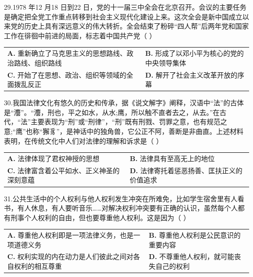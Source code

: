 \documentclass[UTF8,11pt]{ctexart}
\begin{document}
29.1978 年12 月18 日到22 日，党的十一届三中全会在北京召开。会议的主要任务是确定把全党工作重点转移到社会主义现代化建设上来。这次全会是新中国成立以来党的历史上具有深远意义的伟大转折。全会结束了粉碎“四人帮”后两年党和国家工作在徘徊中前进的局面，标志着中国共产党（     ）


\begin{center}\begin{tabular}{>{\raggedright\arraybackslash}p{\dimexpr(\linewidth-4\tabcolsep)/2\relax}>{\raggedright\arraybackslash}p{\dimexpr(\linewidth-4\tabcolsep)/2\relax}}
\textbf{A.} 重新确立了马克思主义的思想路线、政治路线、组织路线 & \textbf{B.} 形成了以邓小平为核心的党的中央领导集体\\[.35em]
\textbf{C.} 开始了在思想、政治、组织等领域的全面拨乱反正 & \textbf{D.} 解开了社会主义改革开放的序幕\\[.35em]\end{tabular}\end{center}

30.我国法律文化有悠久的历史和传承，据《说文解字》阐释，汉语中“法”的古体是“灋”。“灋，刑也，平之如水，从水;鹰，所以触不直者去之，从去。”在古代，“法”主要表现为“刑”或“刑律”，“刑”既有刑戮、罚罪之意，也有规范之意;“鹰”也称“獬豸”，是神话中的独角兽，它公正不阿，善断是非曲直。上述材料表明，在传统文化中人们对法律的理解和诉求是（     ）


\begin{center}\begin{tabular}{>{\raggedright\arraybackslash}p{\dimexpr(\linewidth-4\tabcolsep)/2\relax}>{\raggedright\arraybackslash}p{\dimexpr(\linewidth-4\tabcolsep)/2\relax}}
\textbf{A.} 法律体现了君权神授的思想 & \textbf{B.} 法律具有至高无上的地位\\[.35em]
\textbf{C.} 法律富含着公平如水、正义神圣的深刻意蕴 & \textbf{D.} 法律寄托着惩恶扬善、匡扶正义的价值追求\\[.35em]\end{tabular}\end{center}

31.公共生活中的个人权利与他人权利发生冲突在所难免，比如学生宿舍里有人看书，有人休息，有人要听音乐……对解决权利冲突要有正确的认识，虽然每个人都有刑事个人权利的自由，但也要尊重他人权利。这是因为（     ）


\begin{center}\begin{tabular}{>{\raggedright\arraybackslash}p{\dimexpr(\linewidth-4\tabcolsep)/2\relax}>{\raggedright\arraybackslash}p{\dimexpr(\linewidth-4\tabcolsep)/2\relax}}
\textbf{A.} 尊重他人权利即是一项法律义务，也是一项道德义务 & \textbf{B.} 尊重他人权利是公民意识的重要内容\\[.35em]
\textbf{C.} 权利实现的内在动力是人们彼此之间对各自权利的相互尊重 & \textbf{D.} 不尊重他人权利，就可能丧失自己的权利\\[.35em]\end{tabular}\end{center}
\end{document}
